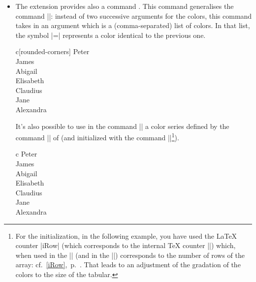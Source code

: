 \documentclass[dvipsnames]{article}
\begin{document}
\begin{itemize}
\bigskip
\item The extension  provides also a command
. This command generalises the
command |\rowcolors|: instead of two successive arguments for the colors, this
command takes in an argument which is a (comma-separated) list of colors. In
that list, the symbol |=| represents a color identical to the previous one.

\smallskip
\begin{Code}[width=10cm,show-output,no-cell-nodes]
\begin{NiceTabular}{c}[rounded-corners]
\CodeBefore
  \emph{}
\Body
  Peter \\
  James \\
  Abigail \\
  Elisabeth \\
  Claudius \\
  Jane \\
  Alexandra \\
\end{NiceTabular}
\end{Code}

\bigskip
It's also possible to use in the command |\rowlistcolors| a color series
defined by the command || of  (and initialized
with the command |\resetcolorseries|\footnote{For the initialization, in the
following example, you have used the LaTeX counter |iRow| (which corresponds to the
internal TeX counter |\c@iRow|) which, when used in the
|\CodeBefore| (and in the |\CodeAfter|) corresponds to the number of rows of
the array: cf.~\ref{iRow},~p.~\pageref{iRow}. That leads to an adjustment of the gradation
of the colors to the size of the tabular.}).


\smallskip
\begin{Code}[width=11.5cm,show-output]
\begin{NiceTabular}{c}
\CodeBefore
  \emph{
  \resetcolorseries[\value{iRow}]{BlueWhite}
  }
\Body
  Peter \\
  James \\
  Abigail \\
  Elisabeth \\
  Claudius \\
  Jane \\
  Alexandra \\
\end{NiceTabular}
\end{Code}
\end{itemize}
\end{document}
